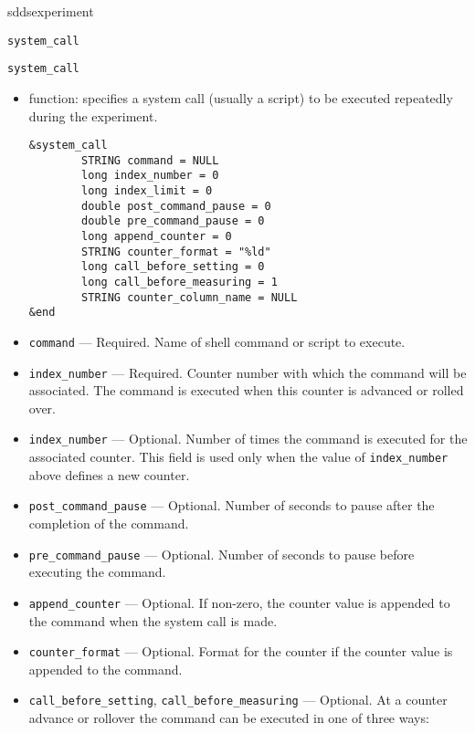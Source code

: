 \begin{sddsprog}{sddsexperiment}
\begin{itemize}
\begin{latexonly}
\newpage\begin{center}{\Large \verb+system_call+}\end{center}
\end{latexonly}
\begin{htmlonly}
\item {\Large \verb+system_call+}
\end{htmlonly}
\begin{itemize}
        \item function: specifies a system call (usually a script) to be executed repeatedly during the experiment.
\begin{verbatim}
&system_call
        STRING command = NULL
        long index_number = 0
        long index_limit = 0
        double post_command_pause = 0
        double pre_command_pause = 0
        long append_counter = 0
        STRING counter_format = "%ld"
        long call_before_setting = 0
        long call_before_measuring = 1
        STRING counter_column_name = NULL 
&end       
\end{verbatim}
        \item {\verb+command+} --- Required. Name of shell command or script to execute.
        \item {\verb+index_number+} --- Required. Counter number with which the command will be associated. The command is executed
                when this counter is advanced or rolled over.
        \item {\verb+index_number+} --- Optional. Number of times the command is executed for 
                the associated counter. This field is used only when the value of {\verb+index_number+} above defines a new counter.
        \item {\verb+post_command_pause+} --- Optional. Number of seconds to pause after the completion of the command.
        \item {\verb+pre_command_pause+} --- Optional. Number of seconds to pause before executing the command.
        \item {\verb+append_counter+} --- Optional. If non-zero, the counter value is appended to the command when the
                system call is made.
        \item {\verb+counter_format+} --- Optional. Format for the counter if the counter value is appended to the command.
        \item {\verb+call_before_setting+}, {\verb+call_before_measuring+} --- Optional. 
                At a counter advance or rollover the command can be executed in one of three ways:

\end{itemize}
\end{itemize}
\end{sddsprog}
